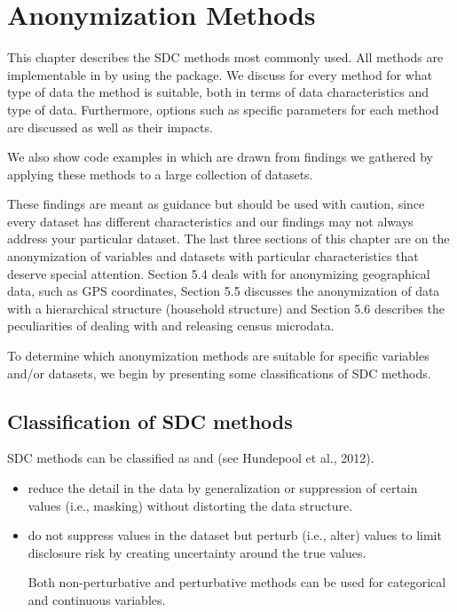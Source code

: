 \documentclass[letterpaper,10pt,english]{sphinxmanual}
\begin{document}
\chapter{Anonymization Methods}
\label{\detokenize{anon_methods::doc}}\label{\detokenize{anon_methods:anonymization-methods}}
This chapter describes the SDC methods most commonly used. All methods
are implementable in  by using the  package. We discuss for
every method for what type of data the method is suitable, both in terms
of data characteristics and type of data. Furthermore, options such as
specific parameters for each method are discussed as well as their
impacts. %
\begin{footnote}[1]\sphinxAtStartFootnote
We also show code examples in  which are drawn from findings we
gathered by applying these methods to a large collection of datasets.
%
\end{footnote} These findings are meant as guidance but
should be used with caution, since every dataset has different
characteristics and our findings may not always address your particular
dataset. The last three sections of this chapter are on the
anonymization of variables and datasets with particular characteristics
that deserve special attention. Section 5.4 deals with for anonymizing
geographical data, such as GPS coordinates, Section 5.5 discusses the
anonymization of data with a hierarchical structure (household
structure) and Section 5.6 describes the peculiarities of dealing with
and releasing census microdata.

To determine which anonymization methods are suitable for specific
variables and/or datasets, we begin by presenting some classifications
of SDC methods.


\section{Classification of SDC methods}
\label{\detokenize{anon_methods:classification-of-sdc-methods}}
SDC methods can be classified as  and
 (see Hundepool et al., 2012).
\begin{itemize}
\item {} 
 reduce the detail in the data by
generalization or suppression of certain values (i.e., masking)
without distorting the data structure.

\item {} 
 do not suppress values in the dataset but
perturb (i.e., alter) values to limit disclosure risk by creating
uncertainty around the true values.

Both non-perturbative and perturbative methods can be used for
categorical and continuous variables.

\end{itemize}
\end{document}
